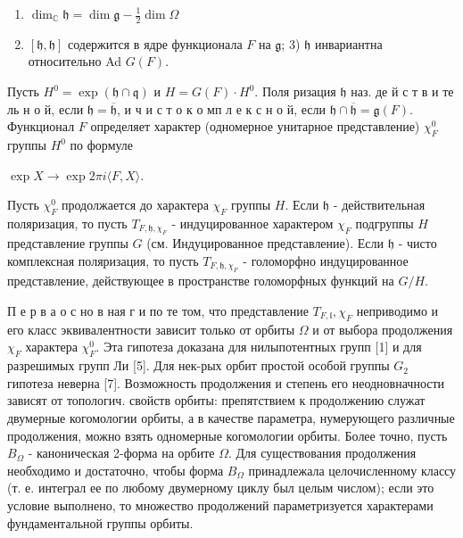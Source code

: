 \documentclass[10pt]{article}
\begin{document}
\begin{enumerate}
  \item $\operatorname{dim}_{\mathbb{C}} \mathfrak{h}=\operatorname{dim} \mathfrak{g}-\frac{1}{2} \operatorname{dim} \Omega$

  \item $[\mathfrak{h}, \mathfrak{h}]$ содержится в ядре функционала $F$ на $\mathfrak{g}$; 3) $\mathfrak{h}$ инвариантна относительно Ad $G(F)$.

\end{enumerate}

Пусть $H^{0}=\exp (\mathfrak{h} \cap \mathfrak{q})$ и $H=G(F) \cdot H^{0}$. Поля ризация $\mathfrak{h}$ наз. де й с т в и те ль н о й, если $\mathfrak{h}=\overline{\mathfrak{h}}$, и ч и с т о к о мп л е к с н о й, если $\mathfrak{h} \cap \overline{\mathfrak{h}}=\mathfrak{g}(F)$. Функционал $F$ определяет характер (одномерное унитарное представление) $\chi_{F}^{0}$ группы $H^{0}$ по формуле

$\exp X \longrightarrow \exp 2 \pi i\langle F, X\rangle$.

Пусть $\chi_{F}^{0}$ продолжается до характера $\chi_{F}$ группы $H$. Если $\mathfrak{h}$ - действительная поляризация, то пусть $T_{F, \mathfrak{h}, \chi_{F}}$ - индуцированное характером $\chi_{F}$ подгруппы $H$ представление группы $G$ (см. Индуцированное представление). Если $\mathfrak{h}$ - чисто комплексная поляризация, то пусть $T_{F, \mathfrak{h}, \chi_{F}}$ - голоморфно индуцированное представление, действующее в пространстве голоморфных функций на $G / H$.

П е р в а о с но в ная г и по те том, что представление $T_{F, \mathfrak{l}}, \chi_{F}$ неприводимо и его класс эквивалентности зависит только от орбиты $\Omega$ и от выбора продолжения $\chi_{F}$ характера $\chi_{F}^{0}$. Эта гипотеза доказана для нилыпотентных групп [1] и для разрешимых групп Ли [5]. Для нек-рых орбит простой особой группы $G_{2}$ гипотеза неверна [7]. Возможность продолжения и степень его неодновначности зависят от топологич. свойств орбиты: препятствием к продолжению служат двумерные когомологии орбиты, а в качестве параметра, нумерующего различные продолжения, можно взять одномерные когомологии орбиты. Более точно, пусть $B_{\Omega}$ - каноническая 2-форма на орбите $\Omega$. Для существования продолжения необходимо и достаточно, чтобы форма $B_{\Omega}$ принадлежала целочисленному классу (т. е. интеграл ее по любому двумерному циклу был целым числом); если это условие выполнено, то множество продолжений параметризуется характерами фундаментальной группы орбиты.
\end{document}
